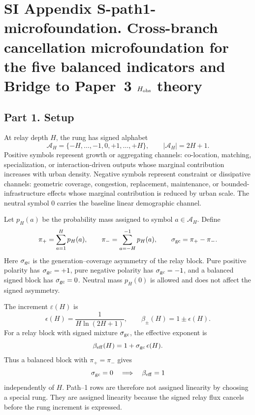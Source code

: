 
\clearpage
\section*{SI Appendix S-path1-microfoundation. Cross-branch cancellation microfoundation for the five balanced indicators and Bridge to Paper~3 \(H_{\rm obs}\) theory}\label{sec:S-path1-microfoundation}
\sloppy

\subsection*{Part 1. Setup}

At relay depth \(H\), the rung has signed alphabet
\[
\mathcal{A}_H=\{-H,\ldots,-1,0,+1,\ldots,+H\},\qquad |\mathcal{A}_H|=2H+1 .
\]
Positive symbols represent growth or aggregating channels: co-location, matching, specialization, or interaction-driven outputs whose marginal contribution increases with urban density. Negative symbols represent constraint or dissipative channels: geometric coverage, congestion, replacement, maintenance, or bounded-infrastructure effects whose marginal contribution is reduced by urban scale. The neutral symbol \(0\) carries the baseline linear demographic channel.

Let \(p_H(a)\) be the probability mass assigned to symbol \(a\in\mathcal{A}_H\). Define
\[
\pi_+ = \sum_{a=1}^{H} p_H(a),\qquad
\pi_- = \sum_{a=-H}^{-1} p_H(a),\qquad
\sigma_{\rm gc}=\pi_+-\pi_- .
\]
Here \(\sigma_{\rm gc}\) is the generation--coverage asymmetry of the relay block. Pure positive polarity has \(\sigma_{\rm gc}=+1\), pure negative polarity has \(\sigma_{\rm gc}=-1\), and a balanced signed block has \(\sigma_{\rm gc}=0\). Neutral mass \(p_H(0)\) is allowed and does not affect the signed asymmetry.

The increment $\varepsilon(H)$ is
\[
\epsilon(H)=\frac{1}{H\ln(2H+1)},\qquad
\beta_\pm(H)=1\pm \epsilon(H).
\]
For a relay block with signed mixture \(\sigma_{\rm gc}\), the effective exponent is
\[
\beta_{\rm eff}(H)=1+\sigma_{\rm gc}\,\epsilon(H).
\]
Thus a balanced block with \(\pi_+=\pi_-\) gives
\[
\sigma_{\rm gc}=0\quad\Longrightarrow\quad \beta_{\rm eff}=1
\]
independently of \(H\). Path--1 rows are therefore not assigned linearity by choosing a special rung. They are assigned linearity because the signed relay flux cancels before the rung increment is expressed.

